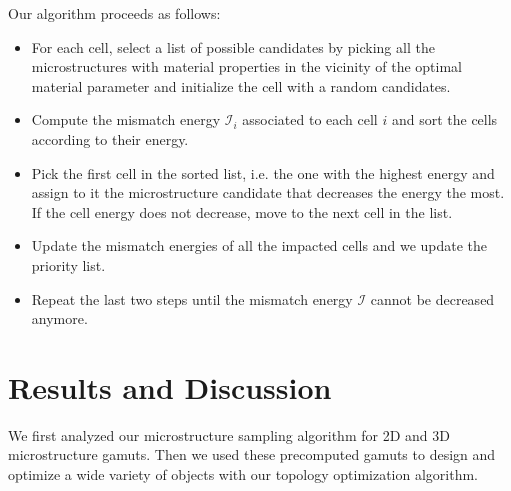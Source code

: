 Our algorithm proceeds as follows:
\begin{itemize}
\item For each cell, select a list of possible candidates by picking all the microstructures with material properties in the vicinity of the optimal material parameter and initialize the cell with a random candidates.
\item Compute the mismatch energy $\mathcal{I}_i$ associated to each cell $i$ and sort the cells according to their energy. 
\item Pick the first cell in the sorted list, i.e. the one with the highest energy and assign to it the microstructure candidate that decreases the energy the most.
If the cell energy does not decrease, move to the next cell in the list.
\item Update the mismatch energies of all the impacted cells and we update the priority list.
\item Repeat the last two steps until the mismatch energy $\mathcal{I}$ cannot be decreased anymore.
\end{itemize}

\section{Results and Discussion}
We first analyzed our microstructure sampling algorithm for 2D and 3D microstructure gamuts. 
Then we used these precomputed gamuts to design and optimize a wide variety of objects with our topology optimization algorithm.
